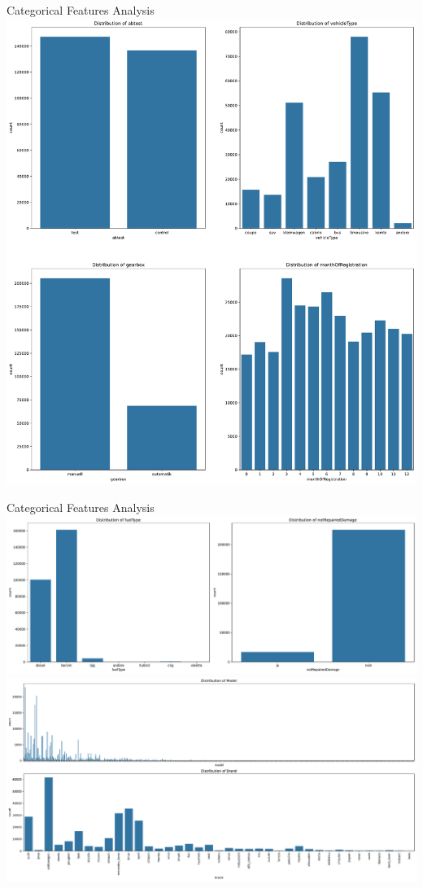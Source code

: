 \documentclass{beamer}
\begin{document}
\begin{frame}{Categorical Features Analysis}
        \center
        \includegraphics[scale=0.2]{cat_features_distribution1.pdf}
\end{frame}

\begin{frame}{Categorical Features Analysis}
        \center
        \includegraphics[scale=0.22]{cat_features_distribution2.pdf}
        \includegraphics[scale=0.2]{model_brand_distribution.pdf}
\end{frame}
\end{document}
